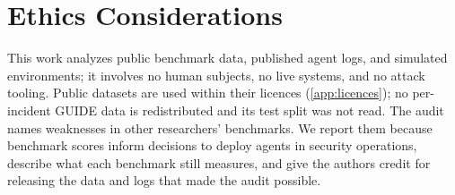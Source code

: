 \section*{Ethics Considerations}
This work analyzes public benchmark data, published agent logs, and simulated environments; it involves no human subjects, no live systems, and no attack tooling. Public datasets are used within their licences (\cref{app:licences}); no per-incident GUIDE data is redistributed and its test split was not read. The audit names weaknesses in other researchers' benchmarks. We report them because benchmark scores inform decisions to deploy agents in security operations, describe what each benchmark still measures, and give the authors credit for releasing the data and logs that made the audit possible.
